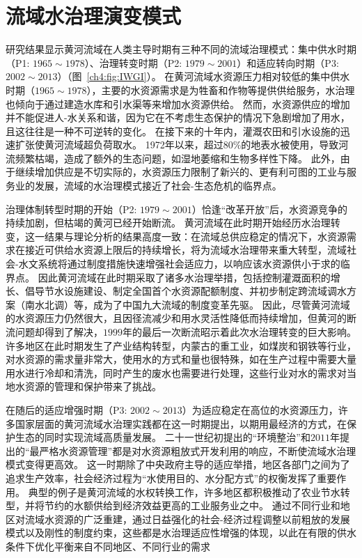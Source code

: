 \section{流域水治理演变模式}

研究结果显示黄河流域在人类主导时期有三种不同的流域治理模式：集中供水时期（P1: $1965 \sim 1978$）、治理转变时期（P2: $1979 \sim 2001$）和适应转向时期（P3: $2002 \sim 2013$）（图~\ref{ch4:fig:IWGI}）。
在黄河流域水资源压力相对较低的集中供水时期（$1965 \sim 1978$），主要的水资源需求是为牲畜和作物等提供供给服务，水治理也倾向于通过建造水库和引水渠等来增加水资源供给。
然而，水资源供应的增加并不能促进人-水关系和谐，因为它在不考虑生态保护的情况下急剧增加了用水，且这往往是一种不可逆转的变化\cite{zhou2020}。
在接下来的十年内，灌溉农田和引水设施的迅速扩张使黄河流域超负荷取水。
1972年以来，超过$80\%$的地表水被使用，导致河流频繁枯竭，造成了额外的生态问题，如湿地萎缩和生物多样性下降\cite{wang2019c}。
此外，由于继续增加供应是不切实际的，水资源压力限制了新兴的、更有利可图的工业与服务业的发展，流域的水治理模式接近了社会-生态危机的临界点\cite{loch2020, wohlfart2016a}。

治理体制转型时期的开始（P2: $1979 \sim 2001$）恰逢“改革开放”后，水资源竞争的持续加剧，但枯竭的黄河已经开始断流。
黄河流域在此时期开始经历水治理转变，这一结果与理论分析的结果高度一致：在流域总供应稳定的情况下，水资源需求在接近可供给水资源上限后的持续增长，将为流域水治理带来重大转型，流域社会-水文系统将通过制度措施快速增强社会适应力，以响应该水资源供小于求的临界点\cite{loch2020}。
因此黄河流域在此时期采取了诸多水治理举措，包括控制灌溉面积的增长、倡导节水设施建设、制定全国首个水资源配额制度、并初步制定跨流域调水方案（南水北调）等\cite{wang2019b,long2020,nickum2021}，成为了中国九大流域的制度变革先驱。
因此，尽管黄河流域的水资源压力仍然很大，且因径流减少和用水灵活性降低而持续增加，但黄河的断流问题却得到了解决，$1999$年的最后一次断流昭示着此次水治理转变的巨大影响\cite{wang2019b}。
许多地区在此时期发生了产业结构转型，内蒙古的重工业，如煤炭和钢铁等行业，对水资源的需求量非常大，使用水的方式和量也很特殊，如在生产过程中需要大量用水进行冷却和清洗，同时产生的废水也需要进行处理，这些行业对水的需求对当地水资源的管理和保护带来了挑战。

在随后的适应增强时期（P3: $2002 \sim 2013$）为适应稳定在高位的水资源压力，许多国家层面的黄河流域水治理实践都在这一时期提出，以期用最经济的方式，在保护生态的同时实现流域高质量发展。
二十一世纪初提出的“环境整治”和$2011$年提出的“最严格水资源管理”都是对水资源粗放式开发利用的响应，不断使流域水治理模式变得更高效。
这一时期除了中央政府主导的适应举措，地区各部门之间为了追求生产效率，社会经济过程为“水使用目的、水分配方式”的权衡发挥了重要作用。
典型的例子是黄河流域的水权转换工作，许多地区都积极推动了农业节水转型，并将节约的水额供给到经济效益更高的工业服务业之中。
通过不同行业和地区对流域水资源的广泛重建，通过日益强化的社会-经济过程调整以前粗放的发展模式以及刚性的制度约束，这些都是水治理适应性增强的体现，以此在有限的供水条件下优化平衡来自不同地区、不同行业的需求\cite{dalin2015,song2022}

